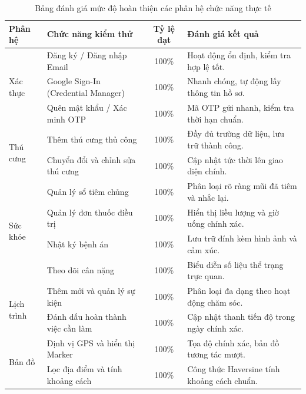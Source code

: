 \begin{table}[H]
    \caption{Bảng đánh giá mức độ hoàn thiện các phân hệ chức năng thực tế}
    \label{tab:danh_gia_chuc_nang}
    \centering
    \renewcommand{\arraystretch}{1.2}
    \begin{tabularx}{\textwidth}{|l|l|c|X|}
        \hline
        \textbf{Phân hệ} & \textbf{Chức năng kiểm thử} & \textbf{Tỷ lệ đạt} & \textbf{Đánh giá kết quả} \\ \hline
        \multirow{3}{*}{Xác thực} 
        & Đăng ký / Đăng nhập Email & 100\% & Hoạt động ổn định, kiểm tra hợp lệ tốt. \\ \cline{2-4}
        & Google Sign-In (Credential Manager) & 100\% & Nhanh chóng, tự động lấy thông tin hồ sơ. \\ \cline{2-4}
        & Quên mật khẩu / Xác minh OTP & 100\% & Mã OTP gửi nhanh, kiểm tra thời hạn chuẩn. \\ \hline
        
        \multirow{2}{*}{Thú cưng} 
        & Thêm thú cưng thủ công & 100\% & Đầy đủ trường dữ liệu, lưu trữ thành công. \\ \cline{2-4}
        & Chuyển đổi và chỉnh sửa thú cưng & 100\% & Cập nhật tức thời lên giao diện chính. \\ \hline

        \multirow{4}{*}{Sức khỏe} 
        & Quản lý sổ tiêm chủng & 100\% & Phân loại rõ ràng mũi đã tiêm và nhắc lại. \\ \cline{2-4}
        & Quản lý đơn thuốc điều trị & 100\% & Hiển thị liều lượng và giờ uống chính xác. \\ \cline{2-4}
        & Nhật ký bệnh án & 100\% & Lưu trữ đính kèm hình ảnh và cảm xúc. \\ \cline{2-4}
        & Theo dõi cân nặng & 100\% & Biểu diễn số liệu thể trạng trực quan. \\ \hline

        \multirow{2}{*}{Lịch trình} 
        & Thêm mới và quản lý sự kiện & 100\% & Phân loại đa dạng theo hoạt động chăm sóc. \\ \cline{2-4}
        & Đánh dấu hoàn thành việc cần làm & 100\% & Cập nhật thanh tiến độ trong ngày chính xác. \\ \hline

        \multirow{2}{*}{Bản đồ} 
        & Định vị GPS và hiển thị Marker & 100\% & Tọa độ chính xác, bản đồ tương tác mượt. \\ \cline{2-4}
        & Lọc địa điểm và tính khoảng cách & 100\% & Công thức Haversine tính khoảng cách chuẩn. \\ \hline
    \end{tabularx}
\end{table}

